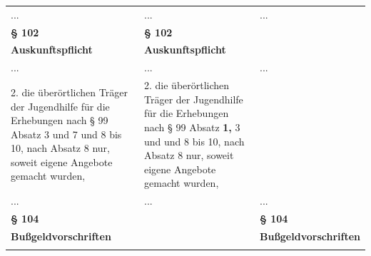 \documentclass[10pt,a4paper,landscape]{article}
\begin{document}
\begin{longtable}{|L{8.2cm}|L{8.2cm}|L{8.2cm}|}
\hhline{|---|}
... & ... & ... \\
\hhline{|---|}
\textbf{\S{} 102} & \textbf{\S{} 102} &  \\
\hhline{|---|}
\textbf{Auskunftspflicht } & \textbf{Auskunftspflicht } &  \\
\hhline{|---|}
... & ... & ... \\
\hhline{|---|}
2.   \newline die überörtlichen Träger der Jugendhilfe für  \newline die Erhebungen nach \S{} 99 Absatz 3 und 7  \newline und 8 bis 10, nach Absatz 8 nur, soweit  \newline eigene Angebote gemacht wurden, & 2.   \newline die überörtlichen Träger der Jugendhilfe für  \newline die Erhebungen nach \S{} 99 Absatz \textbf{\textcolor{diffred}{1,}} 3 und   und 8 bis 10, nach Absatz 8 nur, soweit  \newline eigene Angebote gemacht wurden, &  \\
\hhline{|---|}
... & ... & ... \\
\hhline{|---|}
\textbf{\S{} 104} &  & \textbf{\S{} 104} \\
\hhline{|---|}
\textbf{Bußgeldvorschriften} &  & \textbf{Bußgeldvorschriften} \\
\hhline{|---|}

\end{longtable}
\end{document}
